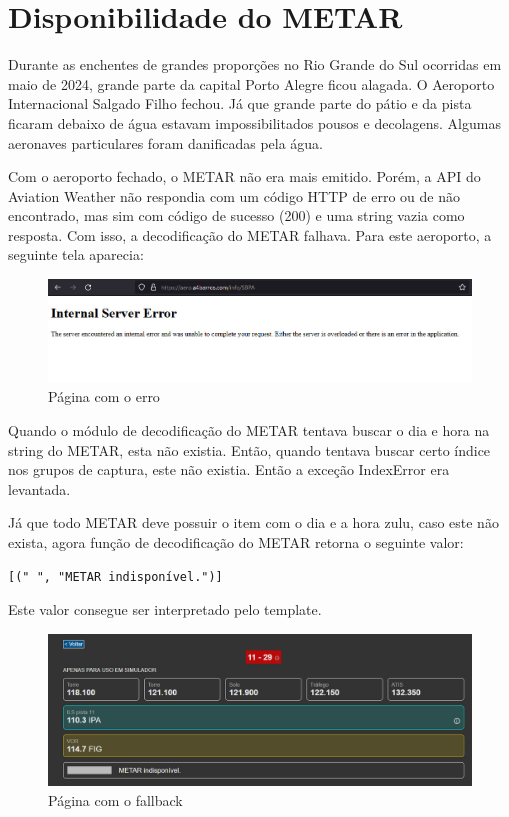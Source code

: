 \chapter{Disponibilidade do METAR}

Durante as enchentes de grandes proporções no Rio Grande do Sul ocorridas em maio 
de 2024, grande parte da capital Porto Alegre ficou alagada. O Aeroporto 
Internacional Salgado Filho fechou. Já que grande parte do pátio e da pista 
ficaram debaixo de água estavam impossibilitados pousos e decolagens. Algumas 
aeronaves particulares foram danificadas pela água.

Com o aeroporto fechado, o METAR não era mais emitido. Porém, a API do Aviation 
Weather não respondia com um código HTTP de erro ou de não encontrado, mas sim 
com código de sucesso (200) e uma string vazia como resposta. Com isso, a decodificação
do METAR falhava. Para este aeroporto, a seguinte tela aparecia:

\begin{figure}[ht]
    \begin{center}
    \includegraphics[width=400pt]{img/sbpa-erro.jpeg}
    \caption{Página com o erro}
    \label{fig:sbpa-erro}
    \end{center}
\end{figure}

Quando o módulo de decodificação do METAR tentava buscar o dia e hora na string 
do METAR, esta não existia. Então, quando tentava buscar certo índice nos grupos 
de captura, este não existia. Então a exceção IndexError era levantada.

Já que todo METAR deve possuir o item com o dia e a hora zulu, caso este não 
exista, agora função de decodificação do METAR retorna o seguinte valor:

\begin{verbatim}
[(" ", "METAR indisponível.")]
\end{verbatim}

Este valor consegue ser interpretado pelo template.

\begin{figure}[ht]
    \begin{center}
    \includegraphics[width=400pt]{img/sbpa.jpeg}
    \caption{Página com o fallback}
    \label{fig:sbpa}
    \end{center}
\end{figure}
